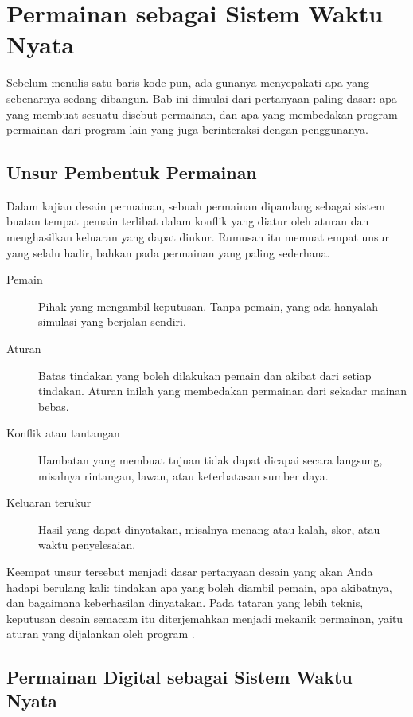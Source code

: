 \section{Permainan sebagai Sistem Waktu Nyata}
\label{sec:permainan-sistem}

Sebelum menulis satu baris kode pun, ada gunanya menyepakati apa yang
sebenarnya sedang dibangun. Bab ini dimulai dari pertanyaan paling dasar:
apa yang membuat sesuatu disebut permainan, dan apa yang membedakan program
permainan dari program lain yang juga berinteraksi dengan penggunanya.

\subsection{Unsur Pembentuk Permainan}

Dalam kajian desain permainan, sebuah permainan dipandang sebagai sistem
buatan tempat pemain terlibat dalam konflik yang diatur oleh aturan dan
menghasilkan keluaran yang dapat diukur. Rumusan itu memuat empat unsur yang
selalu hadir, bahkan pada permainan yang paling sederhana.

\begin{description}
  \item[Pemain] Pihak yang mengambil keputusan. Tanpa pemain, yang ada hanyalah
        simulasi yang berjalan sendiri.
  \item[Aturan] Batas tindakan yang boleh dilakukan pemain dan akibat dari
        setiap tindakan. Aturan inilah yang membedakan permainan dari
        sekadar mainan bebas.
  \item[Konflik atau tantangan] Hambatan yang membuat tujuan tidak dapat
        dicapai secara langsung, misalnya rintangan, lawan, atau keterbatasan
        sumber daya.
  \item[Keluaran terukur] Hasil yang dapat dinyatakan, misalnya menang atau
        kalah, skor, atau waktu penyelesaian.
\end{description}

Keempat unsur tersebut menjadi dasar pertanyaan desain yang akan Anda hadapi
berulang kali: tindakan apa yang boleh diambil pemain, apa akibatnya, dan
bagaimana keberhasilan dinyatakan. Pada tataran yang lebih teknis, keputusan
desain semacam itu diterjemahkan menjadi mekanik permainan, yaitu aturan yang
dijalankan oleh program \cite{unity-leveldesign}.

\subsection{Permainan Digital sebagai Sistem Waktu Nyata}

